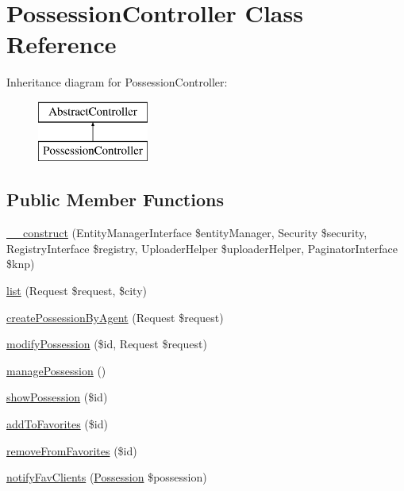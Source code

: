 \hypertarget{class_app_1_1_controller_1_1_possession_controller}{}\section{Possession\+Controller Class Reference}
\label{class_app_1_1_controller_1_1_possession_controller}
Inheritance diagram for Possession\+Controller\+:\begin{figure}[H]
\begin{center}
\leavevmode
\includegraphics[height=2.000000cm]{class_app_1_1_controller_1_1_possession_controller}
\end{center}
\end{figure}
\subsection*{Public Member Functions}
\begin{DoxyCompactItemize}
\item 
\mbox{\hyperlink{class_app_1_1_controller_1_1_possession_controller_a4cff64ebdbee26724bcf620ebaaa83b9}{\+\_\+\+\_\+construct}} (Entity\+Manager\+Interface \$entity\+Manager, Security \$security, Registry\+Interface \$registry, Uploader\+Helper \$uploader\+Helper, Paginator\+Interface \$knp)
\item 
\mbox{\hyperlink{class_app_1_1_controller_1_1_possession_controller_a002fbe18bc0d3456d063eb8c8a9adcae}{list}} (Request \$request, \$city)
\item 
\mbox{\hyperlink{class_app_1_1_controller_1_1_possession_controller_a310b843253754fae7923d7b6a4dbb353}{create\+Possession\+By\+Agent}} (Request \$request)
\item 
\mbox{\hyperlink{class_app_1_1_controller_1_1_possession_controller_af77b741fb74001990f0e1f546bf464f0}{modify\+Possession}} (\$id, Request \$request)
\item 
\mbox{\hyperlink{class_app_1_1_controller_1_1_possession_controller_a53e45f0b6b430ae57a986d97d83c8aa1}{manage\+Possession}} ()
\item 
\mbox{\hyperlink{class_app_1_1_controller_1_1_possession_controller_ab1b51061dc3635ef40e9c5bb0880f519}{show\+Possession}} (\$id)
\item 
\mbox{\hyperlink{class_app_1_1_controller_1_1_possession_controller_aa311b90febc50aedf5f99100e6d5c3d4}{add\+To\+Favorites}} (\$id)
\item 
\mbox{\hyperlink{class_app_1_1_controller_1_1_possession_controller_a41fdb75fdb7315e8c1f703bf3a5ef21d}{remove\+From\+Favorites}} (\$id)
\item 
\mbox{\hyperlink{class_app_1_1_controller_1_1_possession_controller_a8fcc54d734ccc27c3ce276a2e19c03e4}{notify\+Fav\+Clients}} (\mbox{\hyperlink{class_app_1_1_entity_1_1_possession}{Possession}} \$possession)
\end{DoxyCompactItemize}


